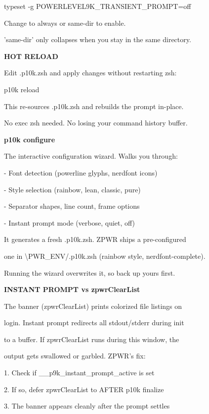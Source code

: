 \documentclass[11pt,a4paper,twoside]{book}
\begin{document}
typeset -g POWERLEVEL9K\_TRANSIENT\_PROMPT=off

Change to always or same-dir to enable.

'same-dir' only collapses when you stay in the same directory.


\vspace{12pt}
{\bfseries\color{neonyellow} HOT RELOAD}\vspace{4pt}

Edit .p10k.zsh and apply changes without restarting zsh:

p10k reload

This re-sources .p10k.zsh and rebuilds the prompt in-place.

No exec zsh needed. No losing your command history buffer.


\vspace{12pt}
{\bfseries\color{neonyellow} p10k configure}\vspace{4pt}

The interactive configuration wizard. Walks you through:

- Font detection (powerline glyphs, nerdfont icons)

- Style selection (rainbow, lean, classic, pure)

- Separator shapes, line count, frame options

- Instant prompt mode (verbose, quiet, off)

It generates a fresh .p10k.zsh. ZPWR ships a pre-configured

one in \textbackslash{}PWR\_ENV/.p10k.zsh (rainbow style, nerdfont-complete).

Running the wizard overwrites it, so back up yours first.


\vspace{12pt}
{\bfseries\color{neonyellow} INSTANT PROMPT vs zpwrClearList}\vspace{4pt}

The banner (zpwrClearList) prints colorized file listings on

login. Instant prompt redirects all stdout/stderr during init

to a buffer. If zpwrClearList runs during this window, the

output gets swallowed or garbled. ZPWR's fix:

1. Check if \_\_p9k\_instant\_prompt\_active is set

2. If so, defer zpwrClearList to AFTER p10k finalize

3. The banner appears cleanly after the prompt settles
\end{document}
